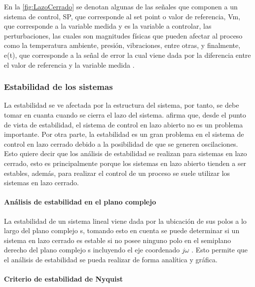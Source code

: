 			En la \cref{fig:LazoCerrado} se denotan algunas de las señales que componen a un sistema de control, SP, que corresponde al set point o valor de referencia, Vm, que corresponde a la variable medida y es la variable a controlar, las perturbaciones, las cuales son magnitudes físicas que pueden afectar al proceso como la temperatura ambiente, presión, vibraciones, entre otras, y finalmente, e(t), que corresponde a la señal de error la cual viene dada por la diferencia entre el valor de referencia y la variable medida \Parencite{maloney2006electronica}.
			
			
		\subsubsection{Estabilidad de los sistemas}

		La estabilidad se ve afectada por la estructura del sistema, por tanto, se debe tomar en cuanta cuando se cierra el lazo del sistema. \textcite{ogata2003ingenieria} afirma que, desde el punto de vista de estabilidad, el sistema de control en lazo abierto no es un problema importante. Por otra parte, la estabilidad es un gran problema en el sistema de control en lazo cerrado debido a la posibilidad de que se generen oscilaciones. Esto quiere decir que los análisis de estabilidad se realizan para sistemas en lazo cerrado, esto es principalmente porque los sistemas en lazo abierto tienden a ser estables, además, para realizar el control de un proceso se suele utilizar los sistemas en lazo cerrado.

			\paragraph{Análisis de estabilidad en el plano complejo}
			
				La estabilidad de un sistema lineal viene dada por la ubicación de sus polos a lo largo del plano complejo s, tomando esto en cuenta se puede determinar si un sistema en lazo cerrado es estable si no posee ninguno polo en el semiplano derecho del plano complejo s incluyendo el eje coordenado $j\omega$ \Parencite{ogata2003ingenieria}. Esto permite que el análisis de estabilidad se pueda realizar de forma analítica y gráfica.
			
			\paragraph{Criterio de estabilidad de Nyquist}
				
